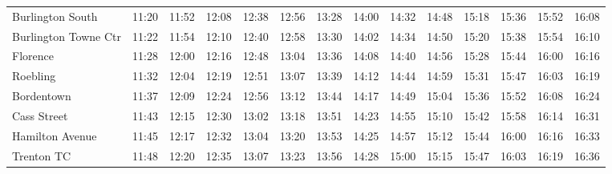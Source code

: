 \begin{center}
\begin{tabular}{@{}lrrrrrrrrrrrrr@{}}
Burlington South & 11:20 & 11:52 & 12:08 & 12:38 & 12:56 & 13:28 & 14:00 & 14:32 & 14:48 & 15:18 & 15:36 & 15:52 & 16:08 \\
Burlington Towne Ctr & 11:22 & 11:54 & 12:10 & 12:40 & 12:58 & 13:30 & 14:02 & 14:34 & 14:50 & 15:20 & 15:38 & 15:54 & 16:10 \\
Florence & 11:28 & 12:00 & 12:16 & 12:48 & 13:04 & 13:36 & 14:08 & 14:40 & 14:56 & 15:28 & 15:44 & 16:00 & 16:16 \\
Roebling & 11:32 & 12:04 & 12:19 & 12:51 & 13:07 & 13:39 & 14:12 & 14:44 & 14:59 & 15:31 & 15:47 & 16:03 & 16:19 \\
Bordentown & 11:37 & 12:09 & 12:24 & 12:56 & 13:12 & 13:44 & 14:17 & 14:49 & 15:04 & 15:36 & 15:52 & 16:08 & 16:24 \\
Cass Street & 11:43 & 12:15 & 12:30 & 13:02 & 13:18 & 13:51 & 14:23 & 14:55 & 15:10 & 15:42 & 15:58 & 16:14 & 16:31 \\
Hamilton Avenue & 11:45 & 12:17 & 12:32 & 13:04 & 13:20 & 13:53 & 14:25 & 14:57 & 15:12 & 15:44 & 16:00 & 16:16 & 16:33 \\
Trenton TC & 11:48 & 12:20 & 12:35 & 13:07 & 13:23 & 13:56 & 14:28 & 15:00 & 15:15 & 15:47 & 16:03 & 16:19 & 16:36 \\
\bottomrule\end{tabular}\end{center}
